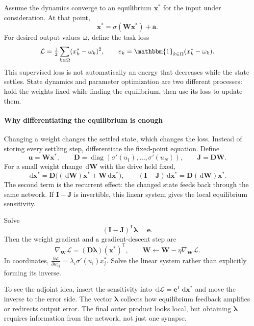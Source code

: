 \documentclass[11pt, oneside]{book}
\newcommand{\dd}{\,\mathrm{d}}
\newcommand{\pd}[2]{\frac{\partial #1}{\partial #2}}
\newcommand{\T}{^{\mathsf{T}}}           %
\newcommand{\diag}{\operatorname{diag}}
\newcommand{\loss}{\mathcal{L}}          %
\newcommand{\params}{\boldsymbol{\theta}}   %
\begin{document}
Assume the dynamics converge to an equilibrium $\mathbf{x}^*$ for the input under consideration. At that point,
\[
 \mathbf{x}^*=\sigma(\mathbf{W}\mathbf{x}^*)+\mathbf{a}.
\]
For desired output values $\boldsymbol{\omega}$, define the task loss
\[
 \loss=\tfrac12\sum_{k\in\Omega}(x_k^*-\omega_k)^2,
 \qquad e_k=\mathbbm{1}_{k\in\Omega}(x_k^*-\omega_k).
\]
This supervised loss is not automatically an energy that decreases while the state settles. State dynamics and parameter optimization are two different processes: hold the weights fixed while finding the equilibrium, then use its loss to update them.

\paragraph{Why differentiating the equilibrium is enough} Changing a weight changes the settled state, which changes the loss. Instead of storing every settling step, differentiate the fixed-point equation. Define
\[
 \mathbf{u}=\mathbf{W}\mathbf{x}^*,\qquad
 \mathbf{D}=\diag(\sigma'(u_1),\ldots,\sigma'(u_N)),\qquad
 \mathbf{J}=\mathbf{D}\mathbf{W}.
\]
For a small weight change $\dd\mathbf{W}$ with the drive held fixed,
\[
 \dd\mathbf{x}^*=\mathbf{D}\bigl((\dd\mathbf{W})\mathbf{x}^*
 +\mathbf{W}\dd\mathbf{x}^*\bigr),
 \qquad
 (\mathbf{I}-\mathbf{J})\dd\mathbf{x}^*=\mathbf{D}(\dd\mathbf{W})\mathbf{x}^*.
\]
The second term is the recurrent effect: the changed state feeds back through the same network. If $\mathbf{I}-\mathbf{J}$ is invertible, this linear system gives the local equilibrium sensitivity.

\begin{thmbox}[title={An equilibrium gradient through one adjoint solve}]
Solve
\[
 (\mathbf{I}-\mathbf{J})\T\boldsymbol{\lambda}=\mathbf{e}.
\]
Then the weight gradient and a gradient-descent step are
\[
 \nabla_{\mathbf{W}}\loss=(\mathbf{D}\boldsymbol{\lambda})(\mathbf{x}^*)\T,
 \qquad
 \mathbf{W}\leftarrow\mathbf{W}-\eta\nabla_{\mathbf{W}}\loss.
\]
In coordinates, $\pd{\loss}{w_{ij}}=\lambda_i\sigma'(u_i)x_j^*$. Solve the linear system rather than explicitly forming its inverse.
\end{thmbox}

To see the adjoint idea, insert the sensitivity into $\dd\loss=\mathbf{e}\T\dd\mathbf{x}^*$ and move the inverse to the error side. The vector $\boldsymbol{\lambda}$ collects how equilibrium feedback amplifies or redirects output error. The final outer product looks local, but obtaining $\boldsymbol{\lambda}$ requires information from the network, not just one synapse.
\end{document}
